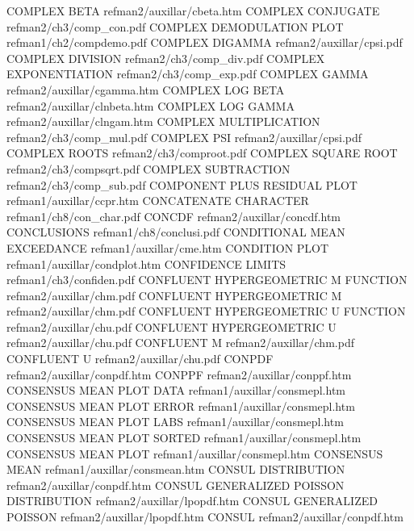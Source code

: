 COMPLEX BETA                            refman2/auxillar/cbeta.htm
COMPLEX CONJUGATE                       refman2/ch3/comp_con.pdf
COMPLEX DEMODULATION PLOT               refman1/ch2/compdemo.pdf
COMPLEX DIGAMMA                         refman2/auxillar/cpsi.pdf
COMPLEX DIVISION                        refman2/ch3/comp_div.pdf
COMPLEX EXPONENTIATION                  refman2/ch3/comp_exp.pdf
COMPLEX GAMMA                           refman2/auxillar/cgamma.htm
COMPLEX LOG BETA                        refman2/auxillar/clnbeta.htm
COMPLEX LOG GAMMA                       refman2/auxillar/clngam.htm
COMPLEX MULTIPLICATION                  refman2/ch3/comp_mul.pdf
COMPLEX PSI                             refman2/auxillar/cpsi.pdf
COMPLEX ROOTS                           refman2/ch3/comproot.pdf
COMPLEX SQUARE ROOT                     refman2/ch3/compsqrt.pdf
COMPLEX SUBTRACTION                     refman2/ch3/comp_sub.pdf
COMPONENT PLUS RESIDUAL PLOT            refman1/auxillar/ccpr.htm
CONCATENATE CHARACTER                   refman1/ch8/con_char.pdf
CONCDF                                  refman2/auxillar/concdf.htm
CONCLUSIONS                             refman1/ch8/conclusi.pdf
CONDITIONAL MEAN EXCEEDANCE             refman1/auxillar/cme.htm
CONDITION PLOT                          refman1/auxillar/condplot.htm
CONFIDENCE LIMITS                       refman1/ch3/confiden.pdf
CONFLUENT HYPERGEOMETRIC M FUNCTION     refman2/auxillar/chm.pdf
CONFLUENT HYPERGEOMETRIC M              refman2/auxillar/chm.pdf
CONFLUENT HYPERGEOMETRIC U FUNCTION     refman2/auxillar/chu.pdf
CONFLUENT HYPERGEOMETRIC U              refman2/auxillar/chu.pdf
CONFLUENT M                             refman2/auxillar/chm.pdf
CONFLUENT U                             refman2/auxillar/chu.pdf
CONPDF                                  refman2/auxillar/conpdf.htm
CONPPF                                  refman2/auxillar/conppf.htm
CONSENSUS MEAN PLOT DATA                refman1/auxillar/consmepl.htm
CONSENSUS MEAN PLOT ERROR               refman1/auxillar/consmepl.htm
CONSENSUS MEAN PLOT LABS                refman1/auxillar/consmepl.htm
CONSENSUS MEAN PLOT SORTED              refman1/auxillar/consmepl.htm
CONSENSUS MEAN PLOT                     refman1/auxillar/consmepl.htm
CONSENSUS MEAN                          refman1/auxillar/consmean.htm
CONSUL DISTRIBUTION                     refman2/auxillar/conpdf.htm
CONSUL GENERALIZED POISSON DISTRIBUTION refman2/auxillar/lpopdf.htm
CONSUL GENERALIZED POISSON              refman2/auxillar/lpopdf.htm
CONSUL                                  refman2/auxillar/conpdf.htm
